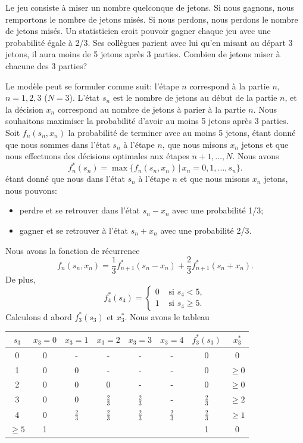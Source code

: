 \begin{example}
Le jeu consiste à miser un nombre quelconque de jetons.
Si nous gagnons, nous remportons le nombre de jetons misés.
Si nous perdons, nous perdons le nombre de jetons misés.
Un statisticien croit pouvoir gagner chaque jeu avec une probabilité égale à 2/3.
Ses collègues parient avec lui qu'en misant au départ 3 jetons, il aura moins de 5 jetons après 3 parties.
Combien de jetons miser à chacune des 3 parties?

Le modèle peut se formuler comme suit:  l'étape $n$ correspond à la partie $n$, $n = 1,2,3$ ($N = 3$).
L'état $s_n$ est le nombre de jetons au début de la partie $n$, et la décision $x_n$ correspond au nombre de jetons à parier à la partie $n$.
Nous souhaitons maximiser la probabilité d'avoir au moins 5 jetons après 3 parties.
Soit $f_n(s_n,x_n)$ la probabilité de terminer avec au moins 5 jetons, étant donné que nous sommes dans l'état $s_n$ à l'étape $n$, que nous misons $x_n$ jetons et que nous effectuons des décisions optimales aux étapes $n+1,\ldots,N$.
Nous avons
\[
 f_n^*(s_n) = \max \lbrace f_n(s_n,x_n) \,|\, x_n = 0,1,\ldots,s_n \rbrace.
\]
étant donné que nous dans l'état $s_n$ à l'étape $n$ et que nous misons $x_n$ jetons, nous pouvons:
\begin{itemize}
\item
perdre et se retrouver dans l'état $s_n - x_n$ avec une probabilité 1/3;
\item
gagner et se retrouver à l'état $s_n + x_n$ avec une probabilité 2/3.
\end{itemize}
Nous avons la fonction de récurrence
\[
f_n(s_n,x_n) = \frac{1}{3}f_{n+1}^*(s_n-x_n) + \frac{2}{3}f_{n+1}^*(s_n+x_n).
\]
De plus,
\[
f_4^*(s_4) =
\begin{cases}
0 &\mbox{ si } s_4 < 5, \\
1 &\mbox{ si } s_4 \geq 5.
\end{cases}
\]
Calculons d abord $f_3^*(s_3)$ et $x_3^*$.
Nous avons le tableau
\begin{center}
\begin{tabular}{|c|c|c|c|c|c|c|c|}
\hline
$s_3$ & $x_3 = 0$ & $x_3 = 1$ & $x_3 = 2$ & $x_3 = 3$ & $x_3 = 4$ & $f_3^*(s_3)$ & $x_3^*$ \\
\hline
0 & 0 & - & - & - & - & 0 & 0 \\
\hline
1 & 0 & 0 & - & - & - & 0 & $\geq 0 $\\
\hline
2 & 0 & 0 & 0 & - & - & 0 & $\geq 0 $\\
\hline
3 & 0 & 0 & $\frac{2}{3}$ & $\frac{2}{3}$ & - & $\frac{2}{3}$ & $\geq 2$\\
\hline
4 & 0 & $\frac{2}{3}$ & $\frac{2}{3}$ & $\frac{2}{3}$ & $\frac{2}{3}$ & $\frac{2}{3}$ & $\geq 1$\\
\hline
$\geq 5$ & 1 & & & & & 1 & 0 \\
\hline
\end{tabular}
\end{center}


\end{example}

